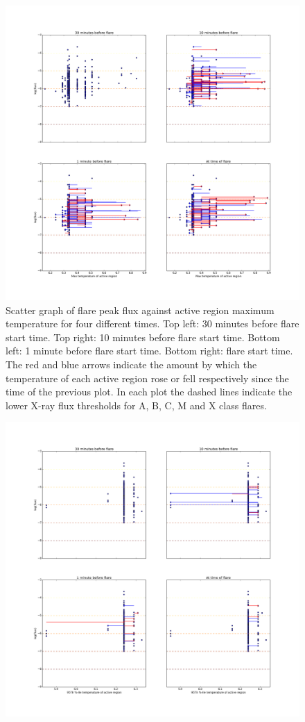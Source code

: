 \documentclass[referee,a4paper,12pt]{swsc}
\begin{document}
\begin{linenumbers}
\begin{figure}
	\centering
		\includegraphics[width=0.9\columnwidth]{tempplotsmax/allflares.png}
	\caption{Scatter graph of flare peak flux against active region maximum temperature for four different times. Top left: 30 minutes before flare start time. Top right: 10 minutes before flare start time. Bottom left: 1 minute before flare start time. Bottom right: flare start time. The red and blue arrows indicate the amount by which the temperature of each active region rose or fell respectively since the time of the previous plot. In each plot the dashed lines indicate the lower X-ray flux thresholds for A, B, C, M and X class flares.}
	\label{fig:allflares_max}
\end{figure}
\begin{figure}
	\centering
		\includegraphics[width=0.9\columnwidth]{tempplots_p95/allflares.png}

\end{figure}
\end{linenumbers}
\end{document}
